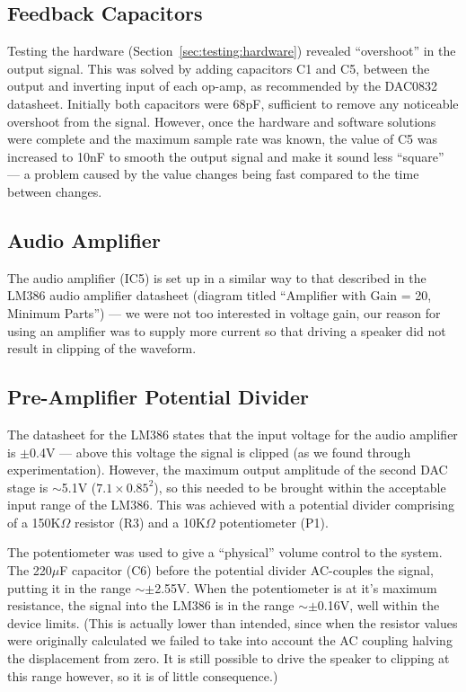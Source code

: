 \subsection{Feedback Capacitors}
\label{sec:design:hardware:feedback}

Testing the hardware (Section~\ref{sec:testing:hardware}) revealed ``overshoot'' in the output 
signal.  This was solved by adding capacitors C1 and C5, between the output and inverting input of 
each op-amp, as recommended by the DAC0832 datasheet\cite{dac0832}.  Initially both capacitors were 
68pF, sufficient to remove any noticeable overshoot from the signal.  However, once the hardware and 
software solutions were complete and the maximum sample rate was known, the value of C5 was 
increased to 10nF to smooth the output signal and make it sound less ``square'' --- a problem caused 
by the value changes being fast compared to the time between changes.

\subsection{Audio Amplifier}

The audio amplifier (IC5) is set up in a similar way to that described in the LM386 audio amplifier 
datasheet\cite{lm386} (diagram titled ``Amplifier with Gain = 20, Minimum Parts'') --- we were not 
too interested in voltage gain, our reason for using an amplifier was to supply more current so that 
driving a speaker did not result in clipping of the waveform.

\subsection{Pre-Amplifier Potential Divider}

The datasheet for the LM386\cite{lm386} states that the input voltage for the audio amplifier is 
$\pm$0.4V --- above this voltage the signal is clipped (as we found through experimentation).  
However, the maximum output amplitude of the second DAC stage is $\sim$5.1V ($7.1\times0.85^2$), so 
this needed to be brought within the acceptable input range of the LM386.  This was achieved with a 
potential divider comprising of a 150K$\Omega$ resistor (R3) and a 10K$\Omega$ potentiometer (P1).  

The potentiometer was used to give a ``physical'' volume control to the system.  The 220$\mu$F 
capacitor (C6) before the potential divider AC-couples the signal, putting it in the range 
$\sim\pm$2.55V.  When the potentiometer is at it's maximum resistance, the signal into the LM386 is 
in the range $\sim\pm$0.16V, well within the device limits.  (This is actually lower than intended, 
since when the resistor values were originally calculated we failed to take into account the AC 
coupling halving the displacement from zero.  It is still possible to drive the speaker to clipping 
at this range however, so it is of little consequence.)


